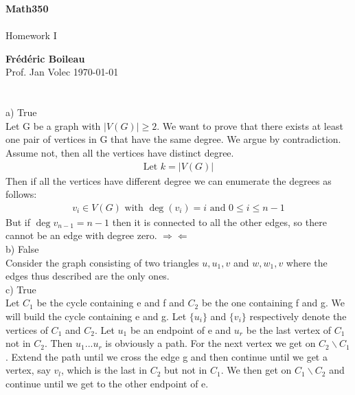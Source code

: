 \documentclass{article}
\begin{document}
	\begin{titlepage}
		\begin{center}
			\vspace*{1cm}
			\textbf{Math350}\\
			\\
			\vspace{0.5cm}
			Homework I
			
			\vspace{1.5cm}
			
			\textbf{Frédéric Boileau}\\
			\vspace{2cm}
			Prof. 
			Jan Volec
			\vfill
			\today
			\thispagestyle{empty}
		\end{center}
	\end{titlepage}
	\newpage
	\tableofcontents
	\thispagestyle{empty}
	\clearpage
	
	\section{}
	a) True\\
	Let G be a graph with $\vert V(G) \vert \ge 2 $. We want to prove that there exists at least one pair of vertices in G that have the same degree. We argue by contradiction. Assume not, then all the vertices have distinct degree.
	\begin{align*}
		\text{Let } k= \vert V(G) \vert
	\end{align*}
	Then if all the vertices have different degree we can enumerate the degrees as follows:
	\begin{align*}
		v_i \in V(G) \text{ with } \deg(v_i) = i \text{ and } 0 \leq i \leq n-1
	\end{align*}
	But if  $\deg v_{n-1} = n-1$ then it is connected to all the other edges, so there cannot be an edge with degree zero. $\Rightarrow \Leftarrow$\\[2ex]
	b) False\\
	Consider the graph consisting of two triangles ${u,u_1,v}$ and ${w,w_1,v}$ where the edges thus described are the only ones.\\[2ex]
	c) True\\
	Let $C_1$ be the cycle containing e and f and $C_2$ be the one containing f and g. We will build the cycle containing e and g. Let $\{u_i\}$ and $\{v_i\}$ respectively denote the vertices of $C_1$ and $C_2$. Let $u_1$ be an endpoint of e and $u_r$ be the last vertex of $C_1$ not in $C_2$. Then $u_1...u_r$ is obviously a path. For the next vertex we get on $C_2\backslash C_1 $. Extend the path until we cross the edge g and then continue until we get a vertex, say $v_l$, which is the last in $C_2$ but not in $C_1$. We then get on $C_1 \backslash C_2$ and continue until we get to the other endpoint of e. 
	
\end{document}
